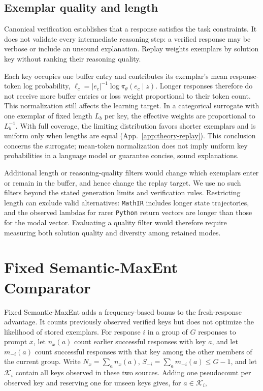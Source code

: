 \subsection{Exemplar quality and length}
\label{app:algorithm-quality}

Canonical verification establishes that a response satisfies the task
constraints. It does not validate every intermediate reasoning step: a
verified response may be verbose or include an unsound explanation. Replay
weights exemplars by solution key without ranking their reasoning quality.

Each key occupies one buffer entry and contributes its exemplar's mean
response-token log probability,
$\ell_c=|e_c|^{-1}\log\pi_\theta(e_c\mid z)$. Longer responses therefore do
not receive more buffer entries or loss weight proportional to their token
count. This normalization still affects the learning target. In a categorical
surrogate with one exemplar of fixed length $L_b$ per key, the effective
weights are proportional to $L_b^{-1}$. With full coverage, the limiting
distribution favors shorter exemplars and is uniform only when lengths are
equal (App.~\ref{app:theory-replay}). This conclusion concerns the surrogate;
mean-token normalization does not imply uniform key probabilities in a
language model or guarantee concise, sound explanations.

Additional length or reasoning-quality filters would change which exemplars
enter or remain in the buffer, and hence change the replay target. We use no
such filters beyond the stated generation limits and verification rules.
Restricting length can exclude valid alternatives: \texttt{MathIR} includes
longer state trajectories, and the observed lambdas for rarer \texttt{Python}
return vectors are longer than those for the modal vector. Evaluating a
quality filter would therefore require measuring both solution quality and
diversity among retained modes.

\section{Fixed Semantic-MaxEnt Comparator}
\label{app:semantic-maxent}

Fixed Semantic-MaxEnt adds a frequency-based bonus to the fresh-response
advantage. It counts previously observed verified keys but does not optimize
the likelihood of stored exemplars. For response $i$ in a group of $G$
responses to prompt $x$, let $n_x(a)$ count earlier successful responses
with key $a$, and let $m_{-i}(a)$ count successful responses with that key
among the other members of the current group. Write
$N_x=\sum_a n_x(a)$, $S_{-i}=\sum_a m_{-i}(a)\le G-1$, and let
$\mathcal K_i$ contain all keys observed in these two sources. Adding one
pseudocount per observed key and reserving one for unseen keys gives,
for $a\in\mathcal K_i$,

